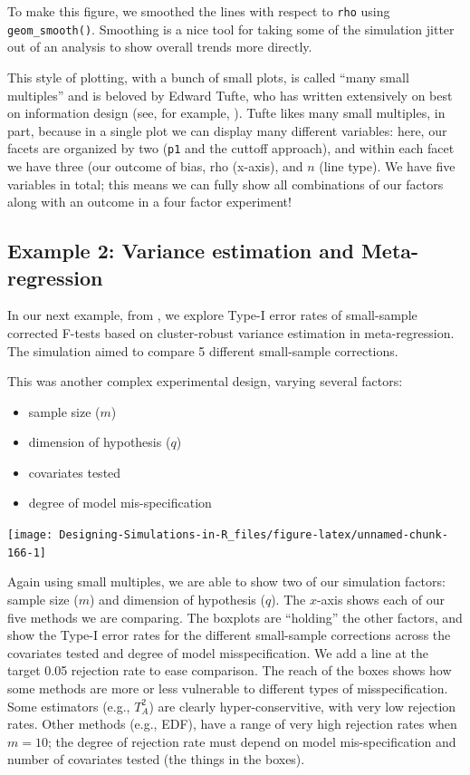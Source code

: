 \documentclass[
]{book}
\providecommand{\tightlist}{%
  \setlength{\itemsep}{0pt}\setlength{\parskip}{0pt}}
\begin{document}
To make this figure, we smoothed the lines with respect to \texttt{rho} using \texttt{geom\_smooth()}.
Smoothing is a nice tool for taking some of the simulation jitter out of an analysis to show overall trends more directly.

This style of plotting, with a bunch of small plots, is called
``many small multiples'' and is beloved by Edward Tufte, who has written extensively on best on information design (see, for example, \citet{tufte1983visual}).
Tufte likes many small multiples, in part, because in a single plot we can display many different variables: here, our facets are organized by two (\texttt{p1} and the cuttoff approach), and within each facet we have three (our outcome of bias, rho (x-axis), and \(n\) (line type).
We have five variables in total; this means we can fully show all combinations of our factors along with an outcome in a four factor experiment!

\subsection{Example 2: Variance estimation and Meta-regression}\label{example-2-variance-estimation-and-meta-regression}

In our next example, from \citet{tipton2015small}, we explore Type-I error rates of small-sample corrected F-tests based on cluster-robust variance estimation in meta-regression.
The simulation aimed to compare 5 different small-sample corrections.

This was another complex experimental design, varying several factors:

\begin{itemize}
\tightlist
\item
  sample size (\(m\))
\item
  dimension of hypothesis (\(q\))
\item
  covariates tested
\item
  degree of model mis-specification
\end{itemize}

\begin{center}\texttt{[image: Designing-Simulations-in-R\_files/figure-latex/unnamed-chunk-166-1]} \end{center}

Again using small multiples, we are able to show two of our simulation factors: sample size (\(m\)) and dimension of hypothesis (\(q\)).
The \(x\)-axis shows each of our five methods we are comparing.
The boxplots are ``holding'' the other factors, and show the Type-I error rates for the different small-sample corrections across the covariates tested and degree of model misspecification.
We add a line at the target 0.05 rejection rate to ease comparison.
The reach of the boxes shows how some methods are more or less vulnerable to different types of misspecification.
Some estimators (e.g., \(T^2_A\)) are clearly hyper-conservitive, with very low rejection rates.
Other methods (e.g., EDF), have a range of very high rejection rates when \(m = 10\); the degree of rejection rate must depend on model mis-specification and number of covariates tested (the things in the boxes).
\end{document}
